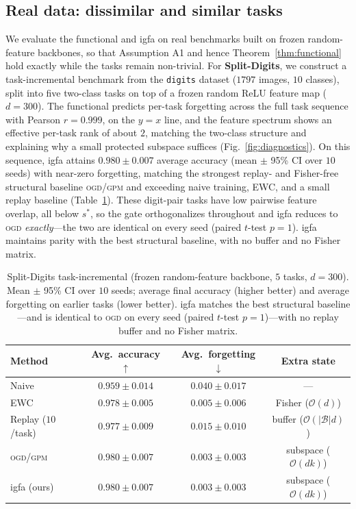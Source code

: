\documentclass[10pt,a4paper]{article}
\theoremstyle{plain}
\theoremstyle{definition}
\newcommand{\sstar}{s^{\ast}}
\newcommand{\IGFA}{igfa}
\newcommand{\OGD}{\textsc{ogd}}
\begin{document}
\subsection{Real data: dissimilar and similar tasks}
\label{sec:exp:real}
We evaluate the functional and \IGFA{} on real benchmarks built on frozen
random-feature backbones, so that Assumption A1 and hence Theorem~\ref{thm:functional}
hold exactly while the tasks remain non-trivial. For \textbf{Split-Digits}, we construct
a task-incremental benchmark from the \texttt{digits} dataset ($1797$ images, $10$
classes), split into five two-class tasks on top of a frozen random ReLU feature map
($d=300$). The functional predicts per-task forgetting across the full task sequence
with Pearson $r=0.999$, on the $y=x$ line, and the feature spectrum shows an effective
per-task rank of about $2$, matching the two-class structure and explaining why a small
protected subspace suffices (Fig.~\ref{fig:diagnostics}). On this sequence, \IGFA{}
attains $0.980\pm0.007$ average accuracy (mean $\pm$ 95\% CI over $10$ seeds) with
near-zero forgetting, matching the strongest replay- and Fisher-free structural baseline
\OGD{}/\textsc{gpm} and exceeding naive training, EWC, and a small replay baseline
(Table~\ref{tab:benchmark}). These digit-pair tasks have low pairwise feature overlap,
all below $\sstar$, so the gate orthogonalizes throughout and \IGFA{} reduces to \OGD{}
\emph{exactly}---the two are identical on every seed (paired $t$-test $p=1$). \IGFA{} maintains parity with the best structural baseline, with no buffer and no Fisher matrix.

\begin{table}[tb]\centering\small
\caption{Split-Digits task-incremental (frozen random-feature backbone, $5$ tasks,
$d=300$). Mean $\pm$ 95\% CI over $10$ seeds; average final accuracy (higher better) and
average forgetting on earlier tasks (lower better). \IGFA{} matches the best structural
baseline---and is identical to \OGD{} on every seed (paired $t$-test $p=1$)---with no
replay buffer and no Fisher matrix.}
\label{tab:benchmark}
\begin{tabular}{lccc}
\toprule
Method & Avg.\ accuracy $\uparrow$ & Avg.\ forgetting $\downarrow$ & Extra state \\
\midrule
Naive            & $0.959\pm0.014$ & $0.040\pm0.017$  & --- \\
EWC \cite{kirkpatrick2017}  & $0.978\pm0.005$ & $0.005\pm0.006$  & Fisher ($\mathcal{O}(d)$) \\
Replay ($10$/task) & $0.977\pm0.009$ & $0.015\pm0.010$ & buffer ($\mathcal{O}(|\mathcal B|d)$) \\
\OGD{}/\textsc{gpm} \cite{farajtabar2020,saha2021} & $\mathbf{0.980\pm0.007}$ & $\mathbf{0.003\pm0.003}$ & subspace ($\mathcal{O}(dk)$) \\
\IGFA{} (ours)   & $\mathbf{0.980\pm0.007}$ & $\mathbf{0.003\pm0.003}$ & subspace ($\mathcal{O}(dk)$) \\
\bottomrule
\end{tabular}
\end{table}
\end{document}
